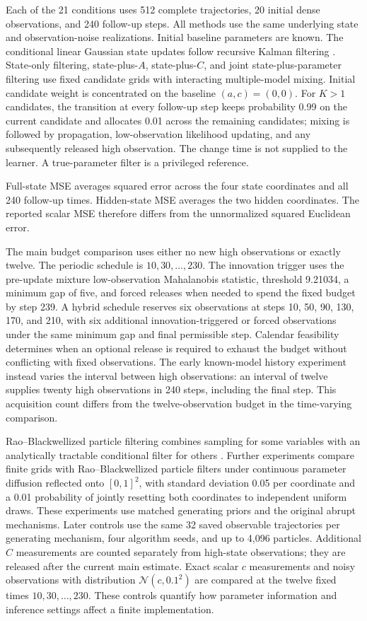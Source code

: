 \documentclass[11pt,a4paper]{article}
\begin{document}
Each of the 21 conditions uses 512 complete trajectories, 20 initial dense observations, and 240 follow-up steps. All methods use the same underlying state and observation-noise realizations. Initial baseline parameters are known. The conditional linear Gaussian state updates follow recursive Kalman filtering \cite{kalman1960}. State-only filtering, state-plus-$A$, state-plus-$C$, and joint state-plus-parameter filtering use fixed candidate grids with interacting multiple-model mixing. Initial candidate weight is concentrated on the baseline $(a,c)=(0,0)$. For $K>1$ candidates, the transition at every follow-up step keeps probability 0.99 on the current candidate and allocates 0.01 across the remaining candidates; mixing is followed by propagation, low-observation likelihood updating, and any subsequently released high observation. The change time is not supplied to the learner. A true-parameter filter is a privileged reference.

Full-state MSE averages squared error across the four state coordinates and all 240 follow-up times. Hidden-state MSE averages the two hidden coordinates. The reported scalar MSE therefore differs from the unnormalized squared Euclidean error.

The main budget comparison uses either no new high observations or exactly twelve. The periodic schedule is $10,30,\ldots,230$. The innovation trigger uses the pre-update mixture low-observation Mahalanobis statistic, threshold 9.21034, a minimum gap of five, and forced releases when needed to spend the fixed budget by step 239. A hybrid schedule reserves six observations at steps 10, 50, 90, 130, 170, and 210, with six additional innovation-triggered or forced observations under the same minimum gap and final permissible step. Calendar feasibility determines when an optional release is required to exhaust the budget without conflicting with fixed observations. The early known-model history experiment instead varies the interval between high observations: an interval of twelve supplies twenty high observations in 240 steps, including the final step. This acquisition count differs from the twelve-observation budget in the time-varying comparison.

Rao--Blackwellized particle filtering combines sampling for some variables with an analytically tractable conditional filter for others \cite{doucet2000}. Further experiments compare finite grids with Rao--Blackwellized particle filters under continuous parameter diffusion reflected onto $[0,1]^2$, with standard deviation 0.05 per coordinate and a 0.01 probability of jointly resetting both coordinates to independent uniform draws. These experiments use matched generating priors and the original abrupt mechanisms. Later controls use the same 32 saved observable trajectories per generating mechanism, four algorithm seeds, and up to 4,096 particles. Additional $C$ measurements are counted separately from high-state observations; they are released after the current main estimate. Exact scalar $c$ measurements and noisy observations with distribution $\mathcal N(c,0.1^2)$ are compared at the twelve fixed times $10,30,\ldots,230$. These controls quantify how parameter information and inference settings affect a finite implementation.
\end{document}
